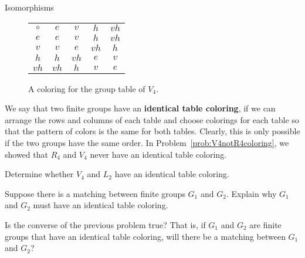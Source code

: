 \begin{section}{Isomorphisms}
\begin{figure}[!ht]
\centering
\begin{tabular}{c!{\vrule width 2pt}c|c|c|c}
$\circ$ & $e$ & $v$ & $h$ & $vh$ \\ 
$e$ & $e$ & $v$ & $h$ & $vh$ \\
\hline {}$v$ & $v$ & $e$ & $vh$ & $h$  \\
\hline {}$h$ & $h$ & $vh$ & $e$ & $v$\\
\hline {}$vh$ & $vh$ & $h$ & $v$ & $e$
\end{tabular}

\caption{A coloring for the group table of $V_4$.}\label{fig:V4coloring}
\end{figure}

We say that two finite groups have an \textbf{identical table coloring}, if we can arrange the rows and columns of each table and choose colorings for each table so that the pattern of colors is the same for both tables.  Clearly, this is only possible if the two groups have the same order. In Problem~\ref{prob:V4notR4coloring}, we showed that $R_4$ and $V_4$ never have an identical table coloring.

\begin{problem}
Determine whether $V_4$ and $L_2$ have an identical table coloring.
\end{problem}

\begin{problem}
Suppose there is a matching between finite groups $G_1$ and $G_2$.  Explain why $G_1$ and $G_2$ must have an identical table coloring.
\end{problem}

\begin{problem}
Is the converse of the previous problem true?  That is, if $G_1$ and $G_2$ are finite groups that have an identical table coloring, will there be a matching between $G_1$ and $G_2$?
\end{problem}


\end{section}
